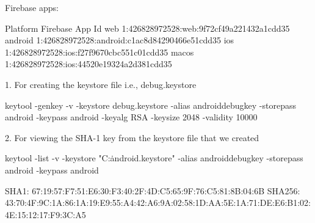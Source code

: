Firebase apps:

Platform  Firebase App Id
web       1:426828972528:web:9f72cf49a221432a1cdd35
android   1:426828972528:android:c1ac8d84290466e51cdd35
ios       1:426828972528:ios:f27f9670cbc551c01cdd35
macos     1:426828972528:ios:44520e19324a2d381cdd35


1. For creating the keystore file i.e., debug.keystore 

keytool -genkey -v -keystore debug.keystore -alias androiddebugkey -storepass android -keypass android -keyalg RSA -keysize 2048 -validity 10000

2. For viewing the SHA-1 key from the keystore file that we created 

keytool -list -v -keystore "C:\Users{}\.android\debug.keystore" -alias androiddebugkey -storepass android -keypass android


SHA1: 67:19:57:F7:51:E6:30:F3:40:2F:4D:C5:65:9F:76:C5:81:8B:04:6B
SHA256: 43:70:4F:9C:1A:86:1A:19:E9:55:A4:42:A6:9A:02:58:1D:AA:5E:1A:71:DE:E6:B1:02:4E:15:12:17:F9:3C:A5